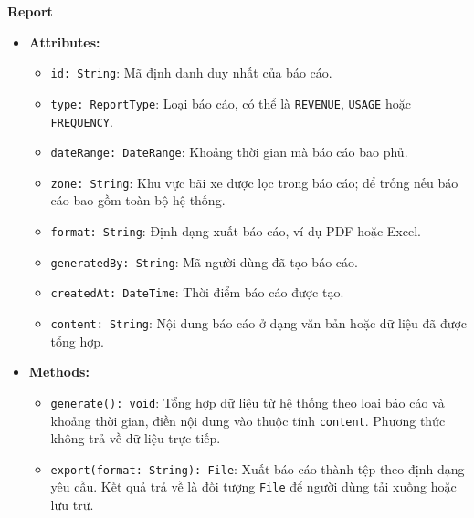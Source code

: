\noindent\textbf{Report}
\begin{itemize}
	\item \textbf{Attributes:}
	\begin{itemize}
		\item \texttt{id: String}: Mã định danh duy nhất của báo cáo.
		\item \texttt{type: ReportType}: Loại báo cáo, có thể là \texttt{REVENUE}, \texttt{USAGE} hoặc \texttt{FREQUENCY}.
		\item \texttt{dateRange: DateRange}: Khoảng thời gian mà báo cáo bao phủ.
		\item \texttt{zone: String}: Khu vực bãi xe được lọc trong báo cáo; để trống nếu báo cáo bao gồm toàn bộ hệ thống.
		\item \texttt{format: String}: Định dạng xuất báo cáo, ví dụ PDF hoặc Excel.
		\item \texttt{generatedBy: String}: Mã người dùng đã tạo báo cáo.
		\item \texttt{createdAt: DateTime}: Thời điểm báo cáo được tạo.
		\item \texttt{content: String}: Nội dung báo cáo ở dạng văn bản hoặc dữ liệu đã được tổng hợp.
	\end{itemize}
	\item \textbf{Methods:}
	\begin{itemize}
		\item \texttt{generate(): void}: Tổng hợp dữ liệu từ hệ thống theo loại báo cáo và khoảng thời gian, điền nội dung vào thuộc tính \texttt{content}. Phương thức không trả về dữ liệu trực tiếp.
		\item \texttt{export(format: String): File}: Xuất báo cáo thành tệp theo định dạng yêu cầu. Kết quả trả về là đối tượng \texttt{File} để người dùng tải xuống hoặc lưu trữ.
	\end{itemize}
\end{itemize}

